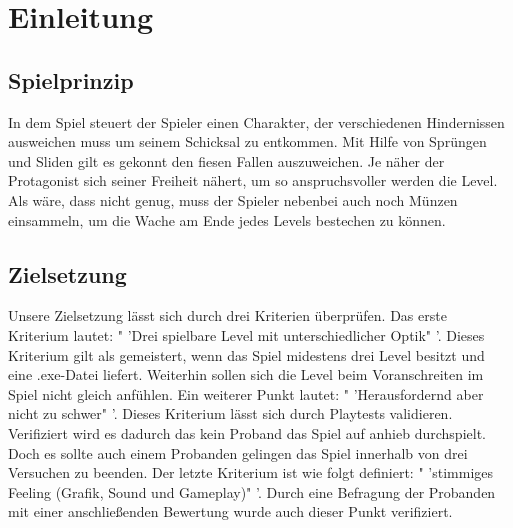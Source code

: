 \documentclass[12pt]{article}
\begin{document}



\newpage

\tableofcontents

\newpage
	
\section{Einleitung}

\vspace{2cm}
\subsection{Spielprinzip}

In dem Spiel steuert der Spieler einen Charakter, der verschiedenen Hindernissen ausweichen muss um seinem Schicksal zu entkommen. Mit Hilfe von
Sprüngen und Sliden gilt es gekonnt den fiesen Fallen auszuweichen. Je näher der Protagonist sich seiner Freiheit nähert, um so anspruchsvoller werden die Level.
Als wäre, dass nicht genug, muss der Spieler nebenbei auch noch Münzen einsammeln, um die Wache am Ende jedes Levels bestechen zu können.

\vspace{2cm}
\subsection{Zielsetzung}

Unsere Zielsetzung lässt sich durch drei Kriterien überprüfen.\newline
Das erste Kriterium lautet: " 'Drei spielbare Level mit unterschiedlicher Optik" '. Dieses
Kriterium gilt als gemeistert, wenn das Spiel midestens drei Level besitzt und eine .exe-Datei liefert. Weiterhin sollen sich die Level beim Voranschreiten im
Spiel nicht gleich anfühlen.\newline
Ein weiterer Punkt lautet: " 'Herausfordernd aber nicht zu schwer" '. Dieses Kriterium lässt sich durch Playtests validieren. Verifiziert wird es dadurch das
kein Proband das Spiel auf anhieb durchspielt. Doch es sollte auch einem Probanden gelingen das Spiel innerhalb von drei Versuchen zu beenden.\newline
Der letzte Kriterium ist wie folgt definiert: " 'stimmiges Feeling (Grafik, Sound und Gameplay)" '. Durch eine Befragung der Probanden mit einer anschließenden
Bewertung wurde auch dieser Punkt verifiziert.

\vspace{2cm}
\end{document}
